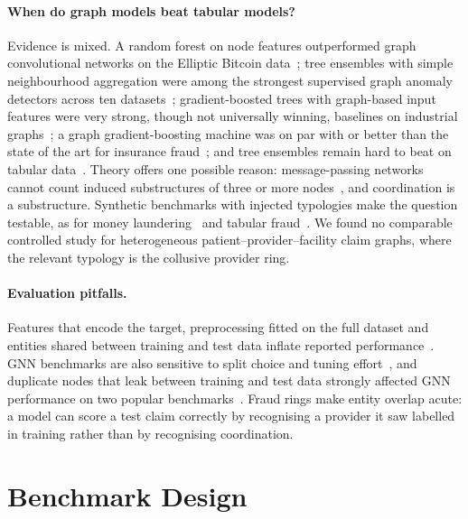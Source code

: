 \documentclass[pdflatex,sn-vancouver-num]{sn-jnl}
\begin{document}
\paragraph{When do graph models beat tabular models?}
Evidence is mixed. A random forest on node features outperformed graph
convolutional networks on the Elliptic Bitcoin data~\cite{weber2019elliptic};
tree ensembles with simple neighbourhood aggregation were among the strongest
supervised graph anomaly detectors across ten datasets~\cite{tang2023gadbench};
gradient-boosted trees with graph-based input features were very strong,
though not universally winning, baselines on industrial
graphs~\cite{bazhenov2025graphland}; a graph gradient-boosting machine was on
par with or better than the state of the art for insurance
fraud~\cite{vandervorst2026}; and tree ensembles remain hard to beat on
tabular data~\cite{grinsztajn2022}. Theory offers one possible reason: message-passing
networks cannot count induced substructures of three or more
nodes~\cite{chen2020count}, and coordination is a substructure. Synthetic benchmarks with injected
typologies make the question testable, as for money
laundering~\cite{altman2023aml} and tabular fraud~\cite{jesus2022baf}. We
found no comparable controlled study for heterogeneous
patient--provider--facility claim graphs, where the relevant typology is the
collusive provider ring.

\paragraph{Evaluation pitfalls.}
Features that encode the target, preprocessing fitted on the full dataset and
entities shared between training and test data inflate reported
performance~\cite{kaufman2012leakage,kapoor2023leakage}. GNN benchmarks are
also sensitive to split choice and tuning effort~\cite{shchur2018pitfalls},
and duplicate nodes that leak between training and test data strongly
affected GNN performance on two popular benchmarks~\cite{platonov2023}. Fraud
rings make entity overlap acute: a model can score a test claim correctly by
recognising a provider it saw labelled in training rather than by
recognising coordination.

\section{Benchmark Design}\label{sec:benchmark}
\end{document}
